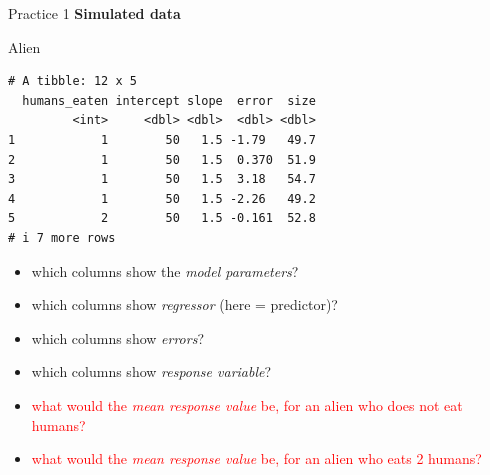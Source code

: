 \documentclass[
  10pt,
  ignorenonframetext,
  aspectratio=169,
  t]{beamer}
\newenvironment{Shaded}{\begin{snugshade}}{\end{snugshade}}
\newcommand{\NormalTok}[1]{\textcolor[rgb]{0.00,0.23,0.31}{#1}}
\providecommand{\tightlist}{%
  \setlength{\itemsep}{0pt}\setlength{\parskip}{0pt}}
\newcommand{\blueit}[1]{\textcolor{bluebeamer}{\emph{#1}}}
\newcommand{\bluebold}[1]{\textcolor{bluebeamer}{\textbf{#1}}}
\begin{document}
\begin{frame}[fragile]{Practice 1}
\protect{}\label{practice-1}
\bluebold{Simulated data}

\footnotesize

\begin{Shaded}
\begin{Highlighting}[]
\NormalTok{Alien}
\end{Highlighting}
\end{Shaded}

\begin{verbatim}
# A tibble: 12 x 5
  humans_eaten intercept slope  error  size
         <int>     <dbl> <dbl>  <dbl> <dbl>
1            1        50   1.5 -1.79   49.7
2            1        50   1.5  0.370  51.9
3            1        50   1.5  3.18   54.7
4            1        50   1.5 -2.26   49.2
5            2        50   1.5 -0.161  52.8
# i 7 more rows
\end{verbatim}

\normalsize

\begin{itemize}
\tightlist
\item
  which columns show the \blueit{model parameters}?
\item
  which columns show \blueit{regressor} (here = predictor)?
\item
  which columns show \blueit{errors}?
\item
  which columns show \blueit{response variable}?
\item
  \textcolor{red}{what would the \blueit{mean response value} be, for an alien who does not eat humans?}
\item
  \textcolor{red}{what would the \blueit{mean response value} be, for an alien who eats 2 humans?}
\end{itemize}
\end{frame}
\end{document}
